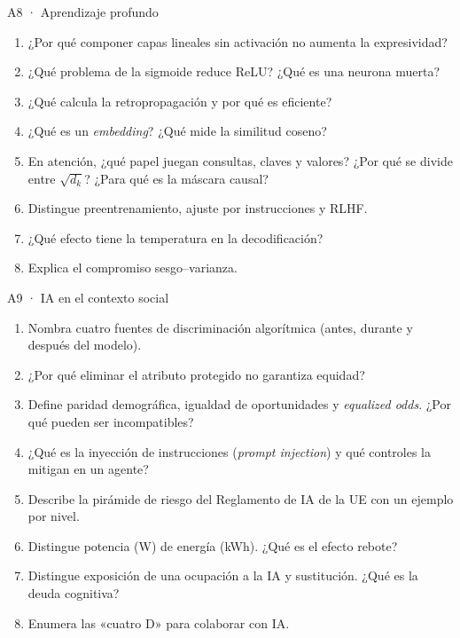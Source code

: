 \begin{ejercicio}{A8 · Aprendizaje profundo }
\begin{enumerate}[label=\arabic*.]
\item ¿Por qué componer capas lineales sin activación no aumenta la expresividad?
\item ¿Qué problema de la sigmoide reduce ReLU? ¿Qué es una neurona muerta?
\item ¿Qué calcula la retropropagación y por qué es eficiente?
\item ¿Qué es un \emph{embedding}? ¿Qué mide la similitud coseno?
\item En atención, ¿qué papel juegan consultas, claves y valores? ¿Por qué se divide entre $\sqrt{d_k}$? ¿Para qué es la máscara causal?
\item Distingue preentrenamiento, ajuste por instrucciones y RLHF.
\item ¿Qué efecto tiene la temperatura en la decodificación?
\item Explica el compromiso sesgo–varianza.
\end{enumerate}
\end{ejercicio}

\begin{ejercicio}{A9 · IA en el contexto social }
\begin{enumerate}[label=\arabic*.]
\item Nombra cuatro fuentes de discriminación algorítmica (antes, durante y después del modelo).
\item ¿Por qué eliminar el atributo protegido no garantiza equidad?
\item Define paridad demográfica, igualdad de oportunidades y \emph{equalized odds}. ¿Por qué pueden ser incompatibles?
\item ¿Qué es la inyección de instrucciones (\emph{prompt injection}) y qué controles la mitigan en un agente?
\item Describe la pirámide de riesgo del Reglamento de IA de la UE con un ejemplo por nivel.
\item Distingue potencia (W) de energía (kWh). ¿Qué es el efecto rebote?
\item Distingue exposición de una ocupación a la IA y sustitución. ¿Qué es la deuda cognitiva?
\item Enumera las «cuatro D» para colaborar con IA.
\end{enumerate}
\end{ejercicio}

\newpage
